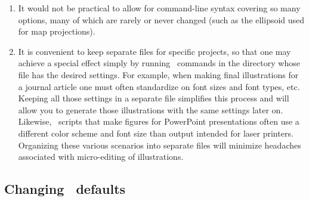 \begin{enumerate}

\item It would not be practical to allow for command-line syntax
covering so many options, many of which are rarely or never
changed (such as the ellipsoid used for map projections).

\item It is convenient to keep separate 
files for specific projects, so that one may achieve a special
effect simply by running \GMT\ commands in the directory whose
 file has the desired settings.  For example,
when making final illustrations for a journal article one must often
standardize on font sizes and font types, etc.  Keeping all those
settings in a separate  file simplifies this
process and will allow you to generate those illustrations with the same settings
later on.  Likewise, \GMT\ scripts that make figures for PowerPoint
presentations often use a different color scheme and font size than
output intended for laser printers.  Organizing these various scenarios
into separate  files will minimize headaches
associated with micro-editing of illustrations.


\end{enumerate}

\subsection{Changing \gmt\ defaults}

